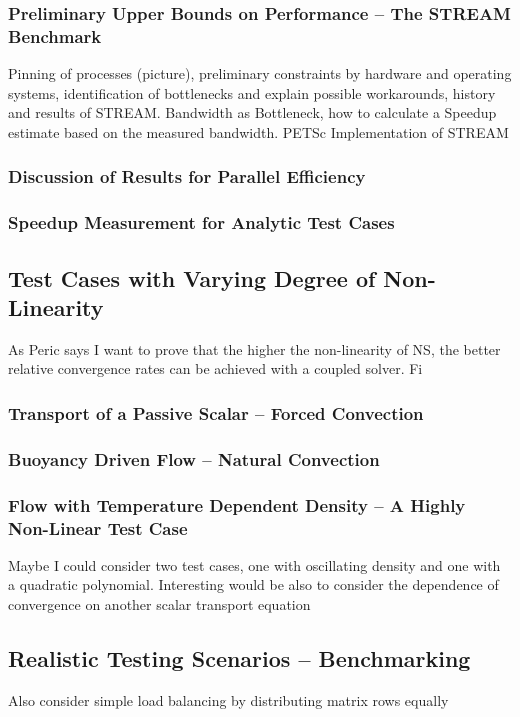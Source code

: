 \documentclass[article,type=msc,colorback,accentcolor=tud2a]{tudthesis}
\begin{document}
      \subsubsection{Preliminary Upper Bounds on Performance -- The STREAM Benchmark}
        Pinning of processes (picture), preliminary constraints by hardware and operating systems, identification of bottlenecks and explain possible workarounds, history and results of STREAM. Bandwidth as Bottleneck, how to calculate a Speedup estimate based on the measured bandwidth. PETSc Implementation of STREAM

      \subsubsection{Discussion of Results for Parallel Efficiency}
      \subsubsection{Speedup Measurement for Analytic Test Cases}

    \subsection{Test Cases with Varying Degree of Non-Linearity}
      
      As Peric says I want to prove that the higher the non-linearity of NS, the better relative convergence rates can be achieved with a coupled solver. Fi

      \subsubsection{Transport of a Passive Scalar -- Forced Convection}
      \subsubsection{Buoyancy Driven Flow -- Natural Convection}
      \subsubsection{Flow with Temperature Dependent Density -- A Highly Non-Linear Test Case}
        Maybe I could consider two test cases, one with oscillating density and one with a quadratic polynomial. Interesting would be also to consider the dependence of convergence on another scalar transport equation

    \subsection{Realistic Testing Scenarios -- Benchmarking}
        Also consider simple load balancing by distributing matrix rows equally
      
\end{document}
